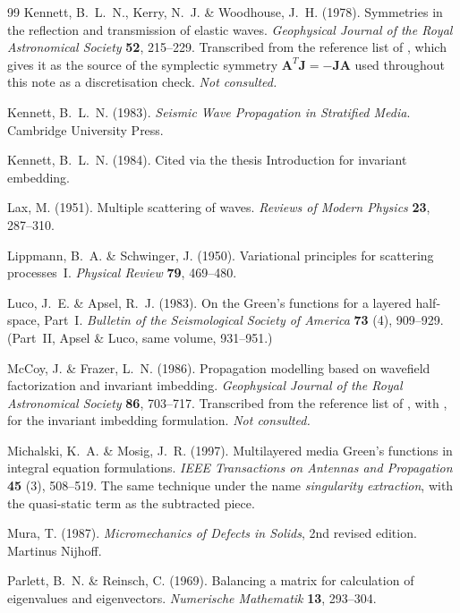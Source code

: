 \documentclass[11pt,a4paper]{article}
\newcommand{\bJ}{\mathbf{J}}
\newcommand{\bA}{\mathbf{A}}
\begin{document}
\begin{thebibliography}{99}
 Kennett, B.~L.~N., Kerry, N.~J. \&
  Woodhouse, J.~H. (1978).  Symmetries in the reflection and transmission of
  elastic waves.  \emph{Geophysical Journal of the Royal Astronomical Society}
  \textbf{52}, 215--229.  Transcribed from the reference list of
  \cite{haines2004}, which gives it as the source of the symplectic symmetry
  $\bA^{T}\bJ=-\bJ\bA$ used throughout this note as a discretisation check.
  \emph{Not consulted.}

 Kennett, B.~L.~N. (1983).  \emph{Seismic Wave
  Propagation in Stratified Media}.  Cambridge University Press.

 Kennett, B.~L.~N. (1984).  Cited via the thesis
  Introduction for invariant embedding.

 Lax, M. (1951).  Multiple scattering of waves.
  \emph{Reviews of Modern Physics} \textbf{23}, 287--310.

 Lippmann, B.~A. \& Schwinger, J. (1950).  Variational
  principles for scattering processes~I.  \emph{Physical Review} \textbf{79},
  469--480.

 Luco, J.~E. \& Apsel, R.~J. (1983).  On the Green's
  functions for a layered half-space, Part~I.  \emph{Bulletin of the
  Seismological Society of America} \textbf{73} (4), 909--929.  (Part~II,
  Apsel \& Luco, same volume, 931--951.)

 McCoy, J. \& Frazer, L.~N. (1986).
  Propagation modelling based on wavefield factorization and invariant
  imbedding.  \emph{Geophysical Journal of the Royal Astronomical Society}
  \textbf{86}, 703--717.  Transcribed from the reference list of
  \cite{haines2004}, with \cite{bellman1959}, for the invariant imbedding
  formulation.  \emph{Not consulted.}

 Michalski, K.~A. \& Mosig, J.~R. (1997).  Multilayered
  media Green's functions in integral equation formulations.  \emph{IEEE
  Transactions on Antennas and Propagation} \textbf{45} (3), 508--519.  The same
  technique under the name \emph{singularity extraction}, with the quasi-static
  term as the subtracted piece.

 Mura, T. (1987).  \emph{Micromechanics of Defects in
  Solids}, 2nd revised edition.  Martinus Nijhoff.

 Parlett, B.~N. \& Reinsch, C. (1969).  Balancing a matrix
  for calculation of eigenvalues and eigenvectors.  \emph{Numerische
  Mathematik} \textbf{13}, 293--304.


\end{thebibliography}
\end{document}
